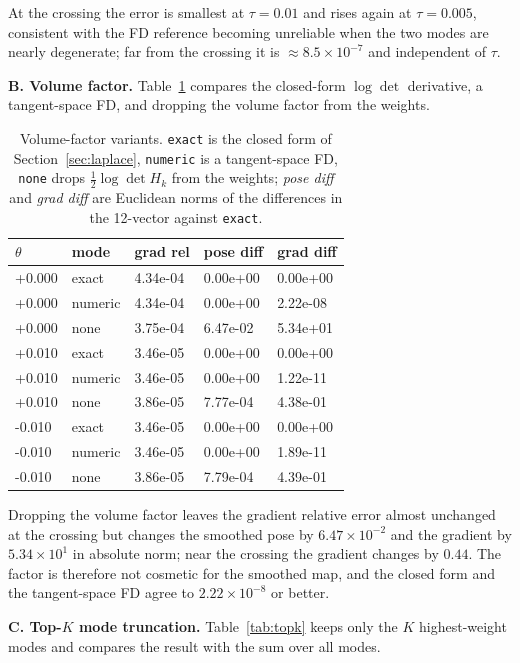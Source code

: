 At the crossing the error is smallest at $\tau=0.01$ and rises again at $\tau=0.005$, consistent with the FD reference becoming unreliable when the two modes are nearly degenerate; far from the crossing it is $\approx8.5\times10^{-7}$ and independent of $\tau$.

\textbf{B. Volume factor.} Table~\ref{tab:volume} compares the closed-form $\log\det$ derivative, a tangent-space FD, and dropping the volume factor from the weights.

\begin{table}[t]
\centering
\caption{Volume-factor variants. \texttt{exact} is the closed form of Section~\ref{sec:laplace}, \texttt{numeric} is a tangent-space FD, \texttt{none} drops $\tfrac12\log\det H_k$ from the weights; \emph{pose diff} and \emph{grad diff} are Euclidean norms of the differences in the 12-vector against \texttt{exact}.}
\label{tab:volume}
\scriptsize
\setlength{\tabcolsep}{3pt}
\begin{tabular}{@{}l l l l l@{}}
\toprule
$\theta$ & mode & grad rel & pose diff & grad diff\\
\midrule
+0.000 & exact & 4.34e-04 & 0.00e+00 & 0.00e+00\\
+0.000 & numeric & 4.34e-04 & 0.00e+00 & 2.22e-08\\
+0.000 & none & 3.75e-04 & 6.47e-02 & 5.34e+01\\
+0.010 & exact & 3.46e-05 & 0.00e+00 & 0.00e+00\\
+0.010 & numeric & 3.46e-05 & 0.00e+00 & 1.22e-11\\
+0.010 & none & 3.86e-05 & 7.77e-04 & 4.38e-01\\
-0.010 & exact & 3.46e-05 & 0.00e+00 & 0.00e+00\\
-0.010 & numeric & 3.46e-05 & 0.00e+00 & 1.89e-11\\
-0.010 & none & 3.86e-05 & 7.79e-04 & 4.39e-01\\
\bottomrule
\end{tabular}
\end{table}

Dropping the volume factor leaves the gradient relative error almost unchanged at the crossing but changes the smoothed pose by $6.47\times10^{-2}$ and the gradient by $5.34\times10^{1}$ in absolute norm; near the crossing the gradient changes by $0.44$. The factor is therefore not cosmetic for the smoothed map, and the closed form and the tangent-space FD agree to $2.22\times10^{-8}$ or better.

\textbf{C. Top-$K$ mode truncation.} Table~\ref{tab:topk} keeps only the $K$ highest-weight modes and compares the result with the sum over all modes.

